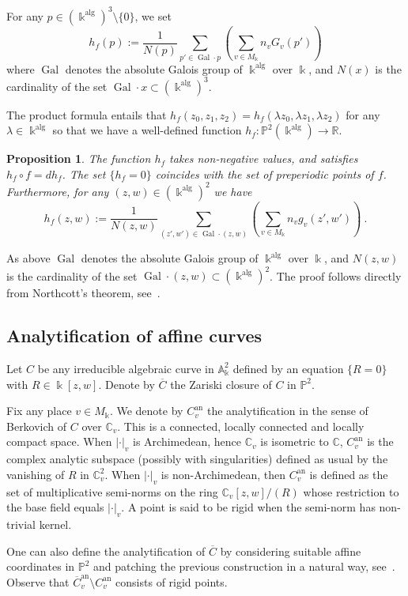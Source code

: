 \documentclass[11 pt, oneside, a4paper]{amsart}
\newcommand{\R}{\mathbb{R}}
\newcommand{\C}{\mathbb{C}}
\newcommand{\nA}{\mathbb{A}}
\newcommand{\nP}{\mathbb{P}}
\newcommand{\nk}{\Bbbk}
\DeclareMathOperator{\Gal}{Gal}
\DeclareMathOperator{\an}{an}
\DeclareMathOperator{\alg}{alg}
\newtheorem{prop}[thm]{Proposition}
\theoremstyle{definition}
\theoremstyle{definition}
\begin{document}
For any $ p \in  (\nk^{\alg})^3\setminus\{0\}$, we set 
\[
h_f(p)
:=
\frac1{N(p)} \sum_{p' \in \Gal\cdot p} \left(\sum_{v\in M_\nk} n_v G_v(p')\right)
\]
where $\Gal$ denotes the absolute Galois group of $ \nk^{\alg}$ over $\nk$, and
$N(x)$ is the cardinality of the set $\Gal\cdot x \subset ( \nk^{\alg})^3$.

The product formula entails that 
$h_f(z_0,z_1,z_2) = h_f(\lambda z_0,\lambda z_1,\lambda z_2) $ for any $\lambda\in  \nk^{\alg}$
so that we have a well-defined function $h_f \colon \nP^2( \nk^{\alg}) \to \R$. 

\begin{prop}
The function $h_f$ takes non-negative values, and satisfies $h_f \circ f = d h_f$. 
The set $\{h_f =0\}$ coincides with the set of preperiodic points of $f$. 
Furthermore,  for any $(z,w) \in (\nk^{\alg})^2$ we have
\[
h_f(z,w)
:=
\frac1{N(z,w)} \sum_{(z',w')\in \Gal\cdot (z,w)} \left(\sum_{v\in M_\nk} n_v g_v(z',w')\right)
~.\]
\end{prop}
As above $\Gal$ denotes the absolute Galois group of $ \nk^{\alg}$ over $\nk$, and
$N(z,w)$ is the cardinality of the set $\Gal\cdot (z,w) \subset (\nk^{\alg})^2$.
The proof follows directly from Northcott's theorem, see~\cite[Corollary~1.1.1]{MR1255693}.

\subsection{Analytification of  affine curves}
Let $C$ be any irreducible algebraic curve in $\nA^2_\nk$ defined by an equation $\{R=0\}$
with $R \in \nk[z,w]$. Denote by $\overline{C}$ the Zariski closure of $C$ in $\nP^2$. 

Fix any place $v\in M_\nk$. We denote by
$C^{\an}_v$ the analytification in the sense of Berkovich of $C$ over $\C_v$. 
This is a connected, locally connected and locally compact space. When
$|\cdot|_v$ is Archimedean, hence $\C_v$ is isometric to $\C$,    
$C^{\an}_v$ is the complex
analytic subspace (possibly with singularities) defined as usual by 
the vanishing of $R$ in $\C_v^2$. 
When $|\cdot|_v$ is non-Archimedean, then 
$C^{\an}_v$ is defined as the set of multiplicative semi-norms on the ring
$\C_v[z,w]/(R)$ whose restriction to the base field equals $|\cdot|_v$.
A point is said to be rigid when the semi-norm has non-trivial kernel. 

One can also define the analytification of $\overline{C}$ by considering suitable affine coordinates in $\nP^2$
and patching the previous construction in a natural way, see~\cite[\S 3.4]{MR1070709}. Observe that $\overline{C}^{\an}_v \setminus C^{\an}_v$
consists of rigid points. 
\end{document}
